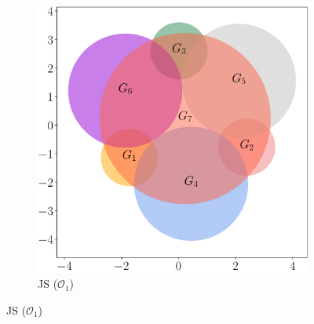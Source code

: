 \documentclass{article}
\begin{document}
\begin{figure}[t]
\begin{subfigure}[b]{.48\textwidth}
\includegraphics[width=\textwidth]{js1}
\caption{JS ($\mathcal{O}_1$)}
\end{subfigure}


\end{figure}
\end{document}

